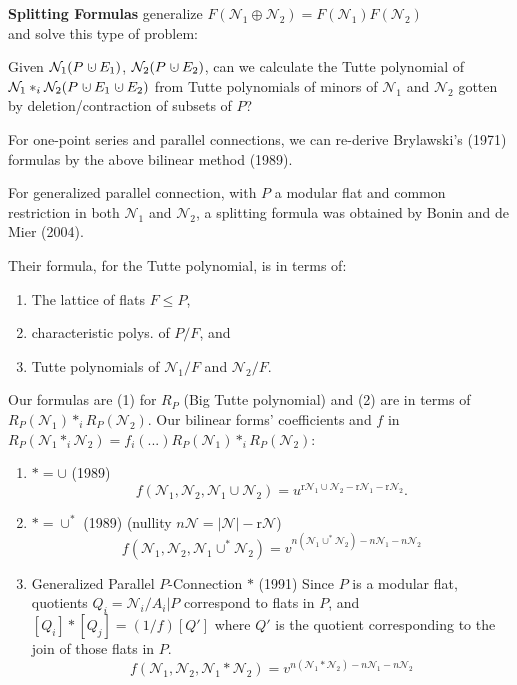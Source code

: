 \documentclass[%
  slidesonly,%
  semlayer,%
  amsmath
  ]{seminar}                                  %
\newcommand{\dunion}
{\mbox{\hbox{\hskip0.45em$\cdot$\hskip-0.44em$\cup$\hskip0.2em}}}
\newcommand{\Rank}{{\mbox{r}}}%
\newcommand{\Card}[1]{\ensuremath{{\left|#1\right|}}}
\begin{document}
\begin{slide}
\textbf{Splitting Formulas} 
generalize $F(\mathcal{N}_1\oplus\mathcal{N}_2)=F(\mathcal{N}_1)F(\mathcal{N}_2)$\\
and solve this type of problem:

Given $\mathcal{N}_1(P\dunion E_1)$, $\mathcal{N}_2(P\dunion E_2)$, can we calculate 
the Tutte polynomial of 
$\mathcal{N}_1*_i\mathcal{N}_2(P\dunion{E_1}\dunion{E_2})$ from
Tutte polynomials of minors of 
$\mathcal{N}_1$ and $\mathcal{N}_2$ gotten by deletion/contraction of subsets of
$P$?

For one-point series and parallel connections, we can re-derive Brylawski's
(1971) formulas by the above bilinear method (1989).

For generalized parallel connection, with $P$ a modular flat and common restriction
in both $\mathcal{N}_1$ and $\mathcal{N}_2$, a splitting formula was obtained
by Bonin and de Mier (2004).  

Their formula, for the Tutte polynomial, 
is in terms of:
\begin{enumerate}
\item The lattice of flats $F\le P$, 
\item characteristic polys. of $P/F$, and 
\item Tutte polynomials of $\mathcal{N}_1/F$ and 
$\mathcal{N}_2/F$.
\end{enumerate}
\end{slide}

\begin{slide}
Our formulas are (1) for $R_P$ (Big Tutte polynomial)
and (2) are in terms of $R_P(\mathcal{N}_1)*_iR_P(\mathcal{N}_2)$.
Our bilinear forms' coefficients and $f$ in 
$R_P(\mathcal{N}_1*_i\mathcal{N}_2)=f_i(...)R_P(\mathcal{N}_1)*_iR_P(\mathcal{N}_2)$:
\begin{enumerate}
\item $*=\cup$ (1989)
\[
f(\mathcal{N}_1,\mathcal{N}_2,\mathcal{N}_1\cup\mathcal{N}_2) = 
u^{\Rank\mathcal{N}_1\cup\mathcal{N}_2-\Rank\mathcal{N}_1-\Rank\mathcal{N}_2}.
\]
\item $*=\cup^*$ (1989) (nullity $n\mathcal{N}=\Card{\mathcal{N}}-\Rank\mathcal{N}$)
\[
f(\mathcal{N}_1,\mathcal{N}_2,\mathcal{N}_1\cup^*\mathcal{N}_2) = 
v^{n(\mathcal{N}_1\cup^*\mathcal{N}_2)-n\mathcal{N}_1-n\mathcal{N}_2}
\]
\item Generalized Parallel $P$-Connection $*$ (1991)
Since $P$ is a modular flat, quotients 
$Q_i=\mathcal{N}_i/A_i|P$ correspond to flats in $P$,
and $[Q_i]*[Q_j]=(1/f)[Q']$ where $Q'$ is the quotient
corresponding to the join of those flats in $P$.
\[
f(\mathcal{N}_1,\mathcal{N}_2,\mathcal{N}_1*\mathcal{N}_2) = 
v^{n(\mathcal{N}_1*\mathcal{N}_2)-n\mathcal{N}_1-n\mathcal{N}_2}
\]
\end{enumerate}
\end{slide}
\end{document}
